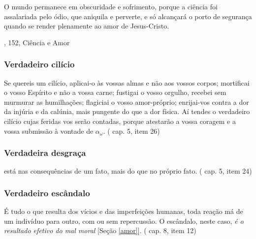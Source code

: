 \documentclass[12pt,a4paper]{article}
\begin{document}
				O mundo permanece em obscuridade e sofrimento, porque a ci\^encia foi assalariada pelo \'odio, que aniquila e perverte, e s\'o alcan\c{c}ar\'a o porto de seguran\c{c}a quando se render plenamente ao amor de Jesus-Cristo.

				\cite{cvv}, 152, Ci\^encia e Amor

			\subsubsection{Verdadeiro cil\'icio}
			\begin{flushright}
			\end{flushright}

				Se quereis um cil\'icio, aplicai-o \`as vossas almas e n\~ao aos vossos corpos; mortificai o vosso Esp\'irito e n\~ao a vossa carne; fustigai o vosso orgulho, recebei sem murmurar as humilha\c{c}\~oes; flagiciai o vosso amor-pr\'oprio; enrijai-vos contra a dor da inj\'uria e da cal\'unia, mais pungente do que a dor f\'isica. A\'i tendes o verdadeiro cil\'icio cujas feridas vos ser\~ao contadas, porque atestar\~ao a vossa coragem e a vossa submiss\~ao \`a vontade de $ \alpha_\omega $\footnotemark[2]. (\cite{ese} cap. 5, item 26)


			\subsubsection{Verdadeira desgra\c{c}a}
			\begin{flushright}
			\end{flushright}

				est\'a nas consequ\^encias de um fato, mais do que no pr\'oprio fato. (\cite{ese} cap. 5, item 24)

			\subsubsection{Verdadeiro esc\^andalo}
			\begin{flushright}
			\end{flushright}

				\'E tudo o que resulta dos v\'icios e das imperfei\c{c}\~oes \cite{aperfeicoamento} humanas, toda rea\c{c}\~ao m\'a de um indiv\'iduo para outro, com ou sem repercuss\~ao. O esc\^andalo, neste caso, \emph{\'e o resultado efetivo do mal moral} [Se\c{c}\~ao \ref{amor}]. (\cite{ese} cap. 8, item 12)
\end{document}
